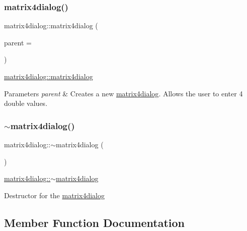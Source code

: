 \subsubsection{\texorpdfstring{matrix4dialog()}{matrix4dialog()}}
{\footnotesize\ttfamily matrix4dialog\+::matrix4dialog (\begin{DoxyParamCaption}\item[{Q\+Widget $\ast$}]{parent = {} }\end{DoxyParamCaption})\hspace{0.3cm}{\ttfamily [explicit]}}



\mbox{\hyperlink{classmatrix4dialog_a5f97315156e47939f8811cce88d8e580}{matrix4dialog\+::matrix4dialog}} 


\begin{DoxyParams}{Parameters}
{\em parent} & Creates a new \mbox{\hyperlink{classmatrix4dialog}{matrix4dialog}}. Allows the user to enter 4 double values. \\
\hline
\end{DoxyParams}
\mbox{\label{classmatrix4dialog_aebc069268fc2120b95dc75338b03cb68}} 
\subsubsection{\texorpdfstring{$\sim$matrix4dialog()}{~matrix4dialog()}}
{\footnotesize\ttfamily matrix4dialog\+::$\sim$matrix4dialog (\begin{DoxyParamCaption}{ }\end{DoxyParamCaption})}



\mbox{\hyperlink{classmatrix4dialog_aebc069268fc2120b95dc75338b03cb68}{matrix4dialog\+::$\sim$matrix4dialog}} 

Destructor for the \mbox{\hyperlink{classmatrix4dialog}{matrix4dialog}} 

\subsection{Member Function Documentation}
\mbox{\label{classmatrix4dialog_a4826be428cb3f2d79905aee086cc296d}} 
